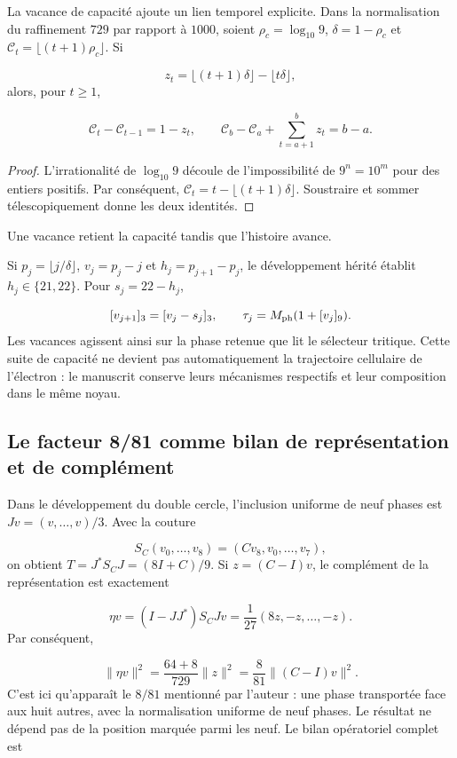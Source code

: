 La vacance de capacité ajoute un lien temporel explicite. Dans la normalisation du raffinement \(729\) par rapport à \(1000\), soient \(\rho_c=\log_{10}9\), \(\delta=1-\rho_c\) et \(\mathcal C_t=\lfloor(t+1)\rho_c\rfloor\). Si

\[
z_t=\lfloor(t+1)\delta\rfloor-\lfloor t\delta\rfloor,
\]
alors, pour \(t\geq1\),

\[
\mathcal C_t-\mathcal C_{t-1}=1-z_t,
\qquad
\mathcal C_b-\mathcal C_a+\sum_{t=a+1}^b z_t=b-a.
\]
\begin{proof}
L'irrationalité de \(\log_{10}9\) découle de l'impossibilité de \(9^n=10^m\) pour des entiers positifs. Par conséquent, \(\mathcal C_t=t-\lfloor(t+1)\delta\rfloor\). Soustraire et sommer télescopiquement donne les deux identités. \end{proof}
Une vacance retient la capacité tandis que l'histoire avance.

Si \(p_j=\lfloor j/\delta\rfloor\), \(v_j=p_j-j\) et \(h_j=p_{j+1}-p_j\), le développement hérité établit \(h_j\in\{21,22\}\). Pour \(s_j=22-h_j\),

\[
[v_{j+1}]_3=[v_j-s_j]_3,\qquad
\tau_j=M_{\rm ph}(1+[v_j]_9).
\]
Les vacances agissent ainsi sur la phase retenue que lit le sélecteur tritique. Cette suite de capacité ne devient pas automatiquement la trajectoire cellulaire de l'électron : le manuscrit conserve leurs mécanismes respectifs et leur composition dans le même noyau.



\subsection{Le facteur 8/81 comme bilan de représentation et de complément}
Dans le développement du double cercle, l'inclusion uniforme de neuf phases est \(Jv=(v,\ldots,v)/3\). Avec la couture

\[
S_C(v_0,\ldots,v_8)=(Cv_8,v_0,\ldots,v_7),
\]
on obtient \(T=J^*S_CJ=(8I+C)/9\). Si \(z=(C-I)v\), le complément de la représentation est exactement

\[
\eta v=(I-JJ^*)S_CJv=\frac1{27}(8z,-z,\ldots,-z).
\]
Par conséquent,

\[
\|\eta v\|^2=\frac{64+8}{729}\|z\|^2
=\frac8{81}\|(C-I)v\|^2.
\]
C'est ici qu'apparaît le \(8/81\) mentionné par l'auteur : une phase transportée face aux huit autres, avec la normalisation uniforme de neuf phases. Le résultat ne dépend pas de la position marquée parmi les neuf. Le bilan opératoriel complet est

